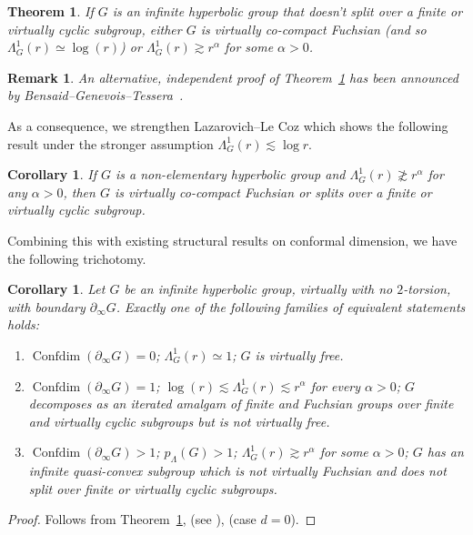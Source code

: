 \documentclass[11pt]{amsart}
\numberwithin{equation}{section}
\newtheorem{theorem}[equation]{Theorem}
\newtheorem{corollary}[equation]{Corollary}
\newtheorem{remark}[equation]{Remark}
\theoremstyle{citing}
\DeclareMathOperator{\Confdim}{Confdim}
\newcommand{\bdry}{\partial_\infty}
\newcommand{\pcrit}{p_{\Lambda}}
\numberwithin{equation}{section}
\begin{document}
\begin{theorem}\label{thm:power-sep-hyp-no-local-cut-points}
	If $G$ is an infinite hyperbolic group that doesn't split over a finite or virtually cyclic subgroup, either $G$ is virtually co-compact Fuchsian (and so $\Lambda^1_G(r) \simeq \log(r)$) or $\Lambda^1_G(r) \gtrsim r^\alpha$ for some $\alpha>0$.
\end{theorem}
\begin{remark}
    An alternative, independent proof of Theorem~\ref{thm:power-sep-hyp-no-local-cut-points} has been announced by Bensaid--Genevois--Tessera~\cite{BenGenTes}.
\end{remark}
As a consequence, we strengthen Lazarovich--Le Coz \cite[Corollary 1.2]{Lazarovich-LeCoz-25} which shows the following result under the stronger assumption $\Lambda^1_G(r) \lesssim \log r$.
\begin{corollary}\label{cor:sep-less-than-powers-splits}
	If $G$ is a non-elementary hyperbolic group and $\Lambda^1_G(r) \not\gtrsim r^\alpha$ for any $\alpha>0$, then $G$ is virtually co-compact Fuchsian or splits over a finite or virtually cyclic subgroup.
\end{corollary}
Combining this with existing structural results on conformal dimension, we have the following trichotomy.
\begin{corollary}\label{cor:hyp-trichotomy} Let $G$ be an infinite hyperbolic group, virtually with no $2$-torsion,  with boundary $\bdry G$. Exactly one of the following families of equivalent statements holds:
\begin{enumerate}
    \item $\Confdim(\bdry G)=0$; $\Lambda^1_G(r)\simeq 1$; $G$ is virtually free.
	\item $\Confdim(\bdry G)=1$; $\log(r)\lesssim \Lambda^1_G(r)\lesssim r^\alpha$ for every $\alpha>0$; $G$ decomposes as an iterated amalgam of finite and Fuchsian groups over finite and virtually cyclic subgroups but is not virtually free.
	\item $\Confdim(\bdry G)>1$; $\pcrit(G)>1$; $\Lambda^1_G(r)\gtrsim r^\alpha$ for some $\alpha>0$; $G$ has an infinite quasi-convex subgroup which is not virtually Fuchsian and does not split over finite or virtually cyclic subgroups.
\end{enumerate}
\end{corollary}
\begin{proof}
	Follows from Theorem~\ref{thm:power-sep-hyp-no-local-cut-points}, \cite[Corollary 1.2]{CarMac-22-confdim1} (see \cite[Corollary 1.3]{Mac-10-confdim}), \cite[Theorem 6.1]{HumeMackTess-PprofLie} (case $d=0$).
\end{proof}
\end{document}
